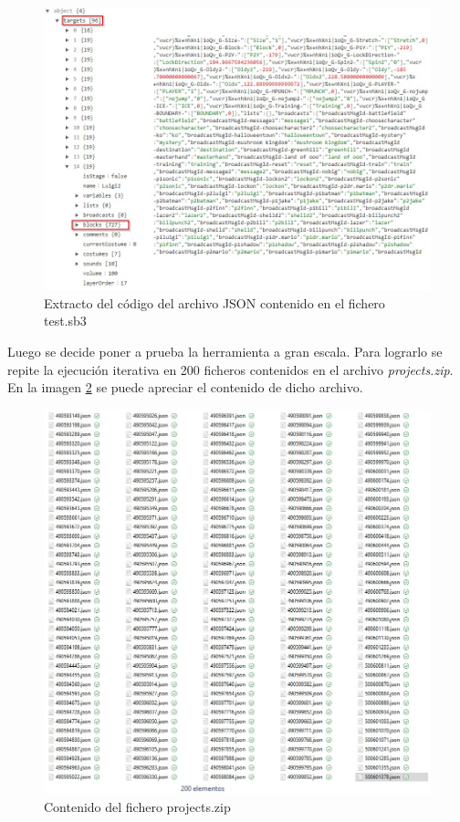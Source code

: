 \documentclass[a4paper, 12pt]{book}
\begin{document}
\begin{figure}[!htb]
  \centering
  \includegraphics[width=13cm, keepaspectratio]{img/jsoncontent.jpg}
  \caption{Extracto del código del archivo JSON contenido en el fichero test.sb3}
  \label{fig:ficherosb3}
\end{figure}

Luego se decide poner a prueba la herramienta a gran escala. Para lograrlo se repite la ejecución iterativa en 200 ficheros contenidos en el archivo \textit{projects.zip}. En la imagen \ref{fig:projectsfiles} se puede apreciar el contenido de dicho archivo. %

\begin{figure}[!htb]
  \centering
  \includegraphics[width=13cm, keepaspectratio]{img/projectsfiles.jpg}
  \caption{Contenido del fichero projects.zip}
  \label{fig:projectsfiles}
\end{figure}
\end{document}
